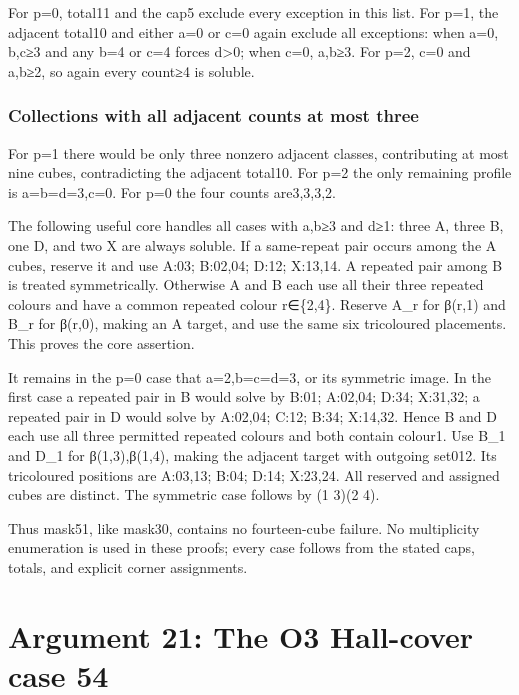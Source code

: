 \documentclass[
  10pt,
]{article}
\begin{document}
For p=0, total11 and the cap5 exclude every exception in this list. For
p=1, the adjacent total10 and either a=0 or c=0 again exclude all
exceptions: when a=0, b,c≥3 and any b=4 or c=4 forces d\textgreater0;
when c=0, a,b≥3. For p=2, c=0 and a,b≥2, so again every count≥4 is
soluble.

\hypertarget{collections-with-all-adjacent-counts-at-most-three}{%
\subsubsection*{Collections with all adjacent counts at most
three}\label{collections-with-all-adjacent-counts-at-most-three}}

For p=1 there would be only three nonzero adjacent classes, contributing
at most nine cubes, contradicting the adjacent total10. For p=2 the only
remaining profile is a=b=d=3,c=0. For p=0 the four counts are3,3,3,2.

The following useful core handles all cases with a,b≥3 and d≥1: three A,
three B, one D, and two X are always soluble. If a same-repeat pair
occurs among the A cubes, reserve it and use A:03; B:02,04; D:12;
X:13,14. A repeated pair among B is treated symmetrically. Otherwise A
and B each use all their three repeated colours and have a common
repeated colour r∈\{2,4\}. Reserve A\_r for β(r,1) and B\_r for β(r,0),
making an A target, and use the same six tricoloured placements. This
proves the core assertion.

It remains in the p=0 case that a=2,b=c=d=3, or its symmetric image. In
the first case a repeated pair in B would solve by B:01; A:02,04; D:34;
X:31,32; a repeated pair in D would solve by A:02,04; C:12; B:34;
X:14,32. Hence B and D each use all three permitted repeated colours and
both contain colour1. Use B\_1 and D\_1 for β(1,3),β(1,4), making the
adjacent target with outgoing set012. Its tricoloured positions are
A:03,13; B:04; D:14; X:23,24. All reserved and assigned cubes are
distinct. The symmetric case follows by (1 3)(2 4).

Thus mask51, like mask30, contains no fourteen-cube failure. No
multiplicity enumeration is used in these proofs; every case follows
from the stated caps, totals, and explicit corner assignments.

\hypertarget{arg-21}{%
\section{Argument 21: The O3 Hall-cover case 54}\label{arg-21}}
\end{document}
